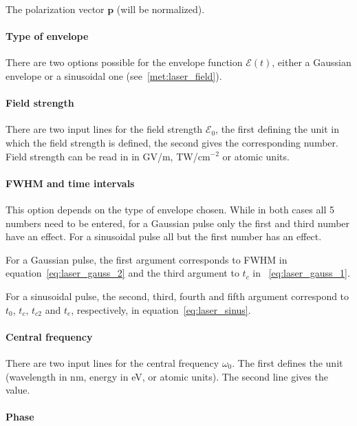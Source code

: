 \documentclass[a4paper,10pt,DIV=15,openany]{scrbook}
\newcommand{\VEC}[1]{\ensuremath{\mathbf{#1}}}
\begin{document}
The polarization vector $\VEC{p}$ (will be normalized).

\paragraph{Type of envelope}

There are two options possible for the envelope function $\mathcal{E}(t)$, either a Gaussian envelope or a sinusoidal one (see~\ref{met:laser_field}).

\paragraph{Field strength}

There are two input lines for the field strength $\mathcal{E}_0$, the first defining the unit in which the field strength is defined, the second gives the corresponding number. Field strength can be read in in GV/m, TW/cm$^{-2}$ or atomic units.

\paragraph{FWHM and time intervals}

This option depends on the type of envelope chosen. While in both cases all 5 numbers need to be entered, for a Gaussian pulse only the first and third number have an effect. For a sinusoidal pulse all but the first number has an effect.

For a Gaussian pulse, the first argument corresponds to FWHM in equation~\eqref{eq:laser_gauss_2} and the third argument to $t_c$ in ~\eqref{eq:laser_gauss_1}.

For a sinusoidal pulse, the second, third, fourth and fifth argument correspond to $t_0$, $t_c$, $t_{c2}$ and $t_e$, respectively, in equation~\eqref{eq:laser_sinus}.

\paragraph{Central frequency}

There are two input lines for the central frequency $\omega_0$. The first defines the unit (wavelength in nm, energy in eV, or atomic units). The second line gives the value.

\paragraph{Phase}
\end{document}
